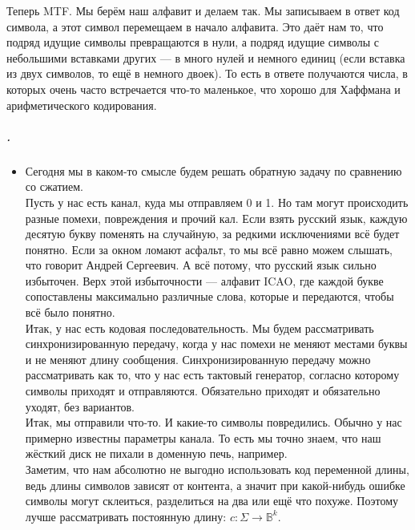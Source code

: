 \documentclass{article}
\begin{document}
\begin{itemize}
\begin{Comment}
            Теперь MTF. Мы берём наш алфавит и делаем так. Мы записываем в ответ код символа, а этот символ перемещаем в начало алфавита. Это даёт нам то, что подряд идущие символы превращаются в нули, а подряд идущие символы с небольшими вставками других --- в много нулей и немного единиц (если вставка из двух символов, то ещё в немного двоек). То есть в ответе получаются числа, в которых очень часто встречается что-то маленькое, что хорошо для Хаффмана и арифметического кодирования.
        \end{Comment}
    \end{itemize}
    \subparagraph{.}
    \begin{itemize}
        \item[]
        \begin{Comment}
            Сегодня мы в каком-то смысле будем решать обратную задачу по сравнению со сжатием.\\
            Пусть у нас есть канал, куда мы отправляем 0 и 1. Но там могут происходить разные помехи, повреждения и прочий кал. Если взять русский язык, каждую десятую букву поменять на случайную, за редкими исключениями всё будет понятно. Если за окном ломают асфальт, то мы всё равно можем слышать, что говорит Андрей Сергеевич. А всё потому, что русский язык сильно избыточен. Верх этой избыточности --- алфавит ICAO, где каждой букве сопоставлены максимально различные слова, которые и передаются, чтобы всё было понятно.\\
            Итак, у нас есть кодовая последовательность. Мы будем рассматривать синхронизированную передачу, когда у нас помехи не меняют местами буквы и не меняют длину сообщения. Синхронизированную передачу можно рассматривать как то, что у нас есть тактовый генератор, согласно которому символы приходят и отправляются. Обязательно приходят и обязательно уходят, без вариантов.\\
            Итак, мы отправили что-то. И какие-то символы повредились. Обычно у нас примерно известны параметры канала. То есть мы точно знаем, что наш жёсткий диск не пихали в доменную печь, например.\\
            Заметим, что нам абсолютно не выгодно использовать код переменной длины, ведь длины символов зависят от контента, а значит при какой-нибудь ошибке символы могут склеиться, разделиться на два или ещё что похуже. Поэтому лучше рассматривать постоянную длину: $c:\Sigma\to\mathbb B^k$.\\
        \end{Comment}

\end{itemize}
\end{document}
